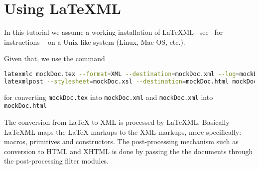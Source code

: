 \documentclass[a4paper]{article}
\def\latexml{{\LaTeX}ML\xspace}
\begin{document}
\section{Using LaTeXML}\label{sec:using}

In this tutorial we assume a working installation of \latexml -- see~\cite{LaTeXML:get}
for instructions -- on a Unix-like system (Linux, Mac OS, etc.). 

 Given that, we use the
command
\begin{lstlisting}[language=bash]
latexmlc mockDoc.tex --format=XML --destination=mockDoc.xml --log=mockDoc.xml.log 
latexmlpost --stylesheet=mockDoc.xsl --destination=mockDoc.html mockDoc.xml
\end{lstlisting}
for converting \lstinline|mockDoc.tex| into \lstinline|mockDoc.xml| and \lstinline|mockDoc.xml| into
\lstinline|mockDoc.html|


The conversion from {\LaTeX} to XML is processed by \latexml. Basically \latexml maps the
{\LaTeX} markups to the XML markups, more specifically: macros, primitives and
constructors. The post-processing mechanism such as conversion to HTML and XHTML is done by 
passing the the documents through the post-processing filter modules.
\end{document}
